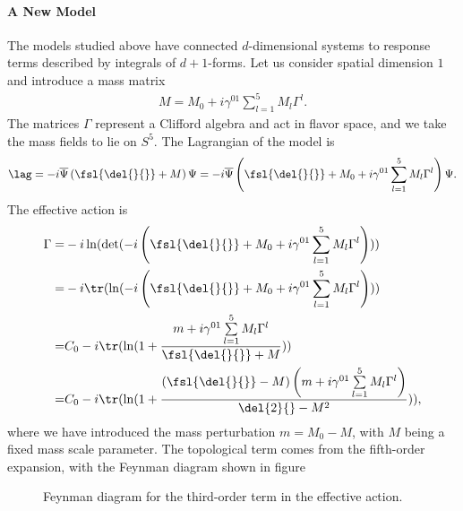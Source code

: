 \paragraph{A New Model}
The models studied above have connected $d$-dimensional systems to response terms described by integrals of $d + 1$-forms. Let us consider spatial dimension $1$ and introduce a mass matrix
\begin{align*}
	M = M_{0} + i\gamma^{01}\sum\limits_{l = 1}^{5}M_{l}\Gamma^{l}.
\end{align*}
The matrices $\Gamma$ represent a Clifford algebra and act in flavor space, and we take the mass fields to lie on $S^{5}$. The Lagrangian of the model is
\begin{align*}
	\lag = -i\overline{\Psi}\left(\fsl{\del{}{}} + M\right)\Psi = -i\overline{\Psi}\left(\fsl{\del{}{}} + M_{0} + i\gamma^{01}\sum\limits_{l = 1}^{5}M_{l}\Gamma^{l}\right)\Psi.
\end{align*}
The effective action is
\begin{align*}
	\Gamma =& -i\ln(\det(-i\left(\fsl{\del{}{}} + M_{0} + i\gamma^{01}\sum\limits_{l = 1}^{5}M_{l}\Gamma^{l}\right))) \\
	       =& -i\tr(\ln(-i\left(\fsl{\del{}{}} + M_{0} + i\gamma^{01}\sum\limits_{l = 1}^{5}M_{l}\Gamma^{l}\right))) \\
	       =& C_{0} - i\tr(\ln(1 + \frac{m + i\gamma^{01}\sum\limits_{l = 1}^{5}M_{l}\Gamma^{l}}{\fsl{\del{}{}} + M})) \\
	       =& C_{0} - i\tr(\ln(1 + \frac{(\fsl{\del{}{}} - M)\left(m + i\gamma^{01}\sum\limits_{l = 1}^{5}M_{l}\Gamma^{l}\right)}{\del{2}{} - M^{2}})),
\end{align*}
where we have introduced the mass perturbation $m = M_{0} - M$, with $M$ being a fixed mass scale parameter. The topological term comes from the fifth-order expansion, with the Feynman diagram shown in figure

\begin{figure}[!ht]
	\centering
	\caption{Feynman diagram for the third-order term in the effective action.}
	\label{fig:fifth_order_fd}
\end{figure}

